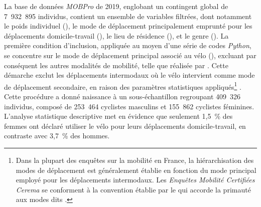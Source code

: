 \begin{refsegment}
La base de données \textsl{MOBPro} de 2019, englobant un contingent global de 7~932~895 individus, contient un ensemble de variables filtrées, dont notamment le poids individuel (), le mode de déplacement principalement emprunté pour les déplacements domicile-travail (), le lieu de résidence (), et le genre (). La première condition d'inclusion, appliquée au moyen d'une série de codes \textsl{Python}, se concentre sur le mode de déplacement principal associé au vélo (), excluant par conséquent les autres modalités de mobilité, telle que réalisée par \textcolor{blue}{\textcite[7]{raux_does_2021}}. Cette démarche exclut les déplacements intermodaux où le vélo intervient comme mode de déplacement secondaire, en raison des paramètres statistiques appliqués\footnote{
    Dans la plupart des enquêtes sur la mobilité en France, la hiérarchisation des modes de déplacement est généralement établie en fonction du mode principal employé pour les déplacements intermodaux. Les \textsl{Enquêtes Mobilité Certifiées \acrshort{Cerema}} se conforment à la convention établie par le \textcolor{blue}{\textcite[32]{cerema_enquetes_2020}} qui accorde la primauté aux modes dits .
} \textcolor{blue}{\autocite[32]{cerema_enquetes_2020}}. Cette procédure a donné naissance à un sous-échantillon regroupant 409~326 individus, composé de 253~464 cyclistes masculins et 155~862 cyclistes féminines. L'analyse statistique descriptive met en évidence que seulement 1,5~\% des femmes ont déclaré utiliser le vélo pour leurs déplacements domicile-travail, en contraste avec 3,7~\% des hommes.%


\end{refsegment}
